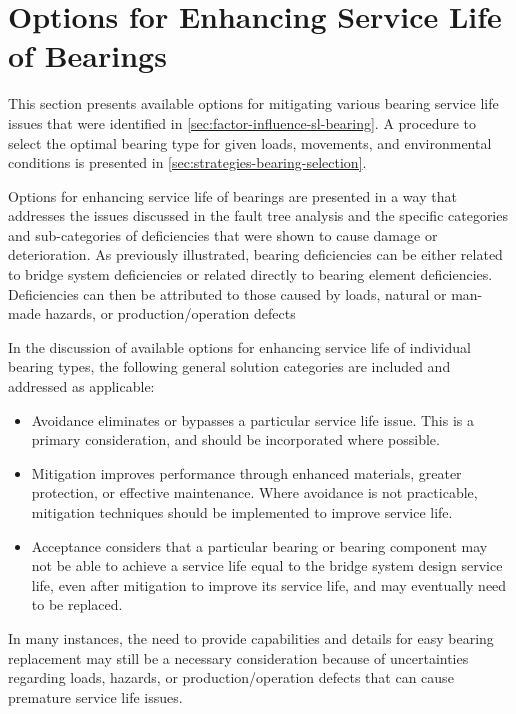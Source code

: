 \section{Options for Enhancing Service Life of Bearings}
\label{sec:option-enhance-sl-bearings}
This section presents available options for mitigating various bearing service life issues that were identified in \cref{sec:factor-influence-sl-bearing}. A procedure to select the optimal bearing type for given loads, movements, and environmental
conditions is presented in \cref{sec:strategies-bearing-selection}.

Options for enhancing service life of bearings are presented in a way that addresses the issues discussed in the fault tree analysis and the specific categories and sub-categories of deficiencies that were shown to cause damage or deterioration. As previously illustrated, bearing deficiencies can be either related to bridge system deficiencies or related directly to bearing element deficiencies. Deficiencies can then be attributed to those caused by loads, natural or man-made hazards, or production/operation defects

In the discussion of available options for enhancing service life of individual bearing types, the following general solution categories are included and addressed as applicable:

\begin{itemize}
  \item Avoidance eliminates or bypasses a particular service life issue. This is a primary consideration, and should
  be incorporated where possible.
  \item Mitigation improves performance through enhanced materials, greater protection, or effective maintenance.
  Where avoidance is not practicable, mitigation techniques should be implemented to improve service life.
  \item Acceptance considers that a particular bearing or bearing component may not be able to achieve a service life
  equal to the bridge system design service life, even after mitigation to improve its service life, and may
  eventually need to be replaced.
\end{itemize}

In many instances, the need to provide capabilities and details for easy bearing replacement may still be a necessary consideration because of uncertainties regarding loads, hazards, or production/operation defects that can cause premature service life issues.

